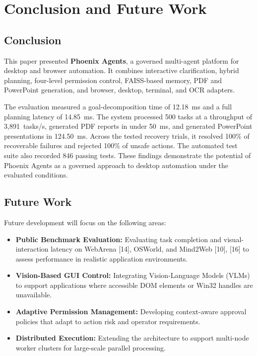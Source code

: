 \documentclass[conference]{IEEEtran}
\begin{document}
\section{Conclusion and Future Work}

\subsection{Conclusion}

This paper presented \textbf{Phoenix Agents}, a governed multi-agent platform for desktop and browser automation. It combines interactive clarification, hybrid planning, four-level permission control, FAISS-based memory, PDF and PowerPoint generation, and browser, desktop, terminal, and OCR adapters.

The evaluation measured a goal-decomposition time of 12.18~ms and
a full planning latency of 14.85~ms. The system processed 500 tasks
at a throughput of 3,891~tasks/s, generated PDF reports in under
50~ms, and generated PowerPoint presentations in 124.50~ms.
Across the tested recovery trials, it resolved 100\% of recoverable
failures and rejected 100\% of unsafe actions. The automated test
suite also recorded 846 passing tests. These findings demonstrate
the potential of Phoenix Agents as a governed approach to desktop
automation under the evaluated conditions.

\subsection{Future Work}

Future development will focus on the following areas:

\begin{itemize}
    \item \textbf{Public Benchmark Evaluation:} Evaluating task
    completion and visual-interaction latency on WebArena [14],
    OSWorld, and Mind2Web [10], [16] to assess performance in realistic
    application environments.

    \item \textbf{Vision-Based GUI Control:} Integrating
    Vision-Language Models (VLMs) to support applications where
    accessible DOM elements or Win32 handles are unavailable.

    \item \textbf{Adaptive Permission Management:} Developing
    context-aware approval policies that adapt to action risk and
    operator requirements.

    \item \textbf{Distributed Execution:} Extending the architecture
    to support multi-node worker clusters for large-scale parallel
    processing.
\end{itemize}
\end{document}

